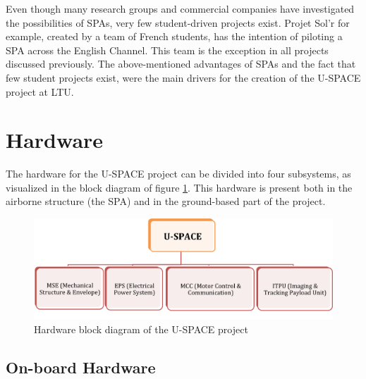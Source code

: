 \noindent
Even though many research groups and commercial companies have investigated the possibilities of \ac{SPA}s, very few student-driven projects exist. Projet Sol'r \cite{website:solr} for example, created by a team of French students, has the intention of piloting a \ac{SPA} across the English Channel. This team is the exception in all projects discussed previously. The above-mentioned advantages of \ac{SPA}s and the fact that few student projects exist, were the main drivers for the creation of the \ac{U-SPACE} project at \ac{LTU}.

\section{Hardware}
\label{sec:intro_hardware}

The hardware for the \ac{U-SPACE} project can be divided into four subsystems, as visualized in the block diagram of figure \ref{fig:hardware_block}. This hardware is present both in the airborne structure (the \ac{SPA}) and in the ground-based part of the project. 

\begin{figure}[htbp!]
\centering
\includegraphics[width=\textwidth]{figures/hardware_block.png}
\caption{Hardware block diagram of the U-SPACE project}
\label{fig:hardware_block}
\end{figure}

\subsection{On-board Hardware}

